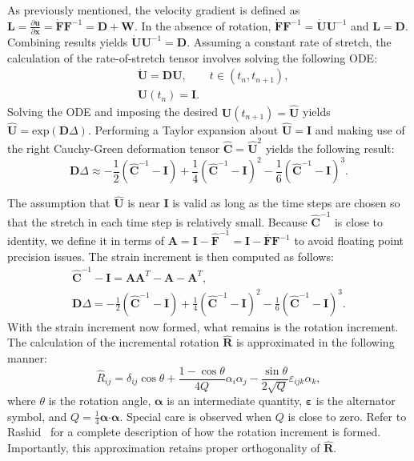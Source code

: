 As previously mentioned, the velocity gradient is defined as $\bm{L} = \frac{\partial \bm{u}}{\partial \bm{x}} = \dot{\bm{F}}\bm{F}^{-1} = \bm{D} + \bm{W}$. In the absence of rotation, $\dot{\bm{F}}\bm{F}^{-1} = \dot{\bm{U}}\bm{U}^{-1}$ and $\bm{L} = \bm{D}$. Combining results yields $\dot{\bm{U}}\bm{U}^{-1} = \bm{D}$. Assuming a constant rate of stretch, the calculation of the rate-of-stretch tensor involves solving the following ODE:
\begin{align}
&\dot{{\bm{U}}} = {\bm{D}}{\bm{U}}, \qquad t\in (t_n, t_{n+1}), \\
&{\bm{U}}\left(t_n\right) = \bm{I}.
\end{align}
Solving the ODE and imposing the desired ${\bm{U}}(t_{n+1}) = \hat{\bm{U}}$ yields $\hat{\bm{U}} = \text{exp}(\bm{D}\Delta)$. Performing a Taylor expansion about $\hat{\bm{U}} = \bm{I}$ and making use of the right Cauchy-Green deformation tensor $\hat{\bm{C}} = \hat{\bm{U}}^2$ yields the following result: 
\begin{equation}
{\bm{D}}\Delta \approx -\frac{1}{2}(\hat{\bm C}^{-1} - {\bm{I}})+ \frac{1}{4} (\hat{\bm{C}}^{-1} - {\bm{I}})^{2} - \frac{1}{6} (\hat{\bm{C}}^{-1} - {\bm{I}})^{3}.
\end{equation}

The assumption that $\hat{\bm{U}}$ is near $\bm{I}$ is valid as long as the time steps are chosen so that the stretch in each time step is relatively small. Because $\hat{\bm{C}}^{-1}$ is close to identity, we define it in terms of $\bm{A} = \bm{I} - \hat{\bm{F}}^{-1} = \bm{I} - \overline{\bm{F}}\bm{F}^{-1}$ to avoid floating point precision issues. The strain increment is then computed as follows:
\begin{gather}
\hat{\bm C}^{-1} - {\bm I} = \bm{A} \bm{A}^T - \bm{A} - \bm{A}^T, \\
{\bm D}\Delta = -\frac{1}{2}(\hat{\bm C}^{-1} - {\bm I})+ \frac{1}{4} (\hat{\bm C}^{-1} - {\bm I})^{2} - \frac{1}{6} (\hat{\bm C}^{-1} - {\bm I})^{3}.
\end{gather}
With the strain increment now formed, what remains is the rotation increment. The calculation of the incremental rotation $\hat{\bm{R}}$ is approximated in the following manner:
\begin{equation}
\hat{R}_{ij} = \delta_{ij}\cos\theta + \frac{1 - \cos \theta}{4Q}\alpha_i\alpha_j - \frac{\sin\theta}{2\sqrt{Q}}\varepsilon_{ijk}\alpha_{k},
\end{equation}
where $\theta$ is the rotation angle, $\boldsymbol{\alpha}$ is an intermediate quantity, $\boldsymbol{\varepsilon}$ is the alternator symbol, and $Q  =\frac{1}{4}\bm{\alpha} \bm{\cdot} \bm{\alpha}$. Special care is observed when $Q$ is close to zero. Refer to Rashid~\cite{rashid_1993} for a complete description of how the rotation increment is formed. Importantly, this approximation retains proper orthogonality of $\hat{\bm{R}}$.

